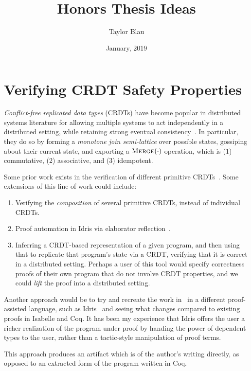 \documentclass{article}
\title{Honors Thesis Ideas}
\author{Taylor Blau}
\date{January, 2019}
\begin{document}
  \maketitle

  \section{Verifying CRDT Safety Properties}
  \textit{Conflict-free replicated data types} (CRDTs) have become popular in
  distributed systems literature for allowing multiple systems to act
  independently in a distributed setting, while retaining strong eventual
  consistency~\cite{shapiro11}. In particular, they do so by forming a
  \textit{monotone join semi-lattice} over possible states, gossiping about
  their current state, and exporting a $\textsc{Merge}(\cdot)$ operation, which
  is (1) commutative, (2) associative, and (3) idempotent.

  Some prior work exists in the verification of different primitive
  CRDTs~\cite{gomes17,zeller14}. Some extensions of this line of work could
  include:
  \begin{enumerate}
    \item Verifying the \textit{composition} of several primitive CRDTs, instead
      of individual CRDTs.
    \item Proof automation in Idris via elaborator
      reflection~\cite{christiansen16}.
    \item Inferring a CRDT-based representation of a given program, and then
      using that to replicate that program's state via a CRDT, verifying that it
      is correct in a distributed setting. Perhaps a user of this tool would
      specify correctness proofs of their own program that do not involve CRDT
      properties, and we could \textit{lift} the proof into a distributed
      setting.
  \end{enumerate}

  Another approach would be to try and recreate the work in~\cite{gomes17} in a
  different proof-assisted language, such as Idris~\cite{brady13} and seeing
  what changes compared to existing proofs in Isabelle and Coq. It has been my
  experience that Idris offers the user a richer realization of the program
  under proof by handing the power of dependent types to the user, rather than a
  tactic-style manipulation of proof terms.

  This approach produces an artifact which is of the author's writing directly,
  as opposed to an extracted form of the program written in Coq.
\end{document}
